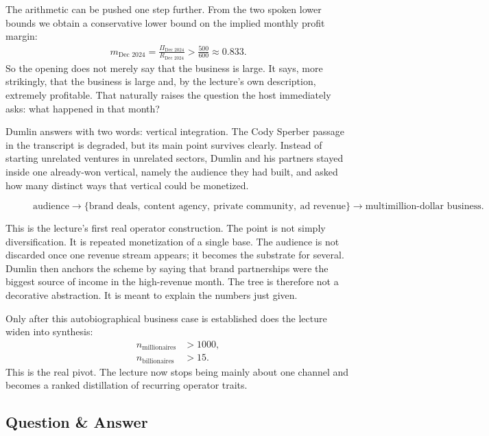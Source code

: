 The arithmetic can be pushed one step further. From the two spoken lower bounds we obtain a conservative lower bound on the implied monthly profit margin:
\begin{align}
m_{\text{Dec 2024}}
=
\frac{\Pi_{\text{Dec 2024}}}{R_{\text{Dec 2024}}}
>
\frac{500}{600}
\approx 0.833.
\end{align}
So the opening does not merely say that the business is large. It says, more strikingly, that the business is large and, by the lecture's own description, extremely profitable. That naturally raises the question the host immediately asks: what happened in that month?

Dumlin answers with two words: vertical integration. The Cody Sperber passage in the transcript is degraded, but its main point survives clearly. Instead of starting unrelated ventures in unrelated sectors, Dumlin and his partners stayed inside one already-won vertical, namely the audience they had built, and asked how many distinct ways that vertical could be monetized.

\begin{figure}[h]
\centering
\begin{equation}
\text{audience}
\to
\{\text{brand deals},\ \text{content agency},\ \text{private community},\ \text{ad revenue}\}
\to
\text{multimillion-dollar business}.
\end{equation}
\end{figure}

This is the lecture's first real operator construction. The point is not simply diversification. It is repeated monetization of a single base. The audience is not discarded once one revenue stream appears; it becomes the substrate for several. Dumlin then anchors the scheme by saying that brand partnerships were the biggest source of income in the high-revenue month. The tree is therefore not a decorative abstraction. It is meant to explain the numbers just given.

Only after this autobiographical business case is established does the lecture widen into synthesis:
\begin{align}
n_{\text{millionaires}} &> 1000, \\
n_{\text{billionaires}} &> 15.
\end{align}
This is the real pivot. The lecture now stops being mainly about one channel and becomes a ranked distillation of recurring operator traits.

\subsection{Question \& Answer}

